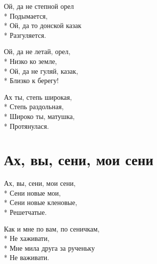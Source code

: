 \medskip

\begin{minipage}{\linewidth}
Ой, да не степной орел\\*
Подымается,\\*
Ой, да то донской казак\\*
Разгуляется.\\
\end{minipage}\par\medskip\nobreak

\medskip

\begin{minipage}{\linewidth}
Ой, да не летай, орел,\\*
Низко ко земле,\\*
Ой, да не гуляй, казак,\\*
Близко к берегу!\\
\end{minipage}\par\medskip\nobreak

\medskip

\begin{minipage}{\linewidth}
Ах ты, степь широкая,\\*
Степь раздольная,\\*
Широко ты, матушка,\\*
Протянулася.\\
\end{minipage}

\vspace{\fill}\newpage

\section{Ах, вы, сени, мои сени}
\label{song:Ах,_вы,_сени,_мои_сени}

\medskip

\begin{minipage}{\linewidth}
Ах, вы, сени, мои сени,\\*
Сени новые мои,\\*
Сени новые кленовые,\\*
Решетчатые.\\
\end{minipage}\par\medskip\nobreak

\medskip

\begin{minipage}{\linewidth}
Как и мне по вам, по сеничкам,\\*
Не хаживати,\\*
Мне мила друга за рученьку\\*
Не важивати.\\
\end{minipage}\par\medskip\nobreak

